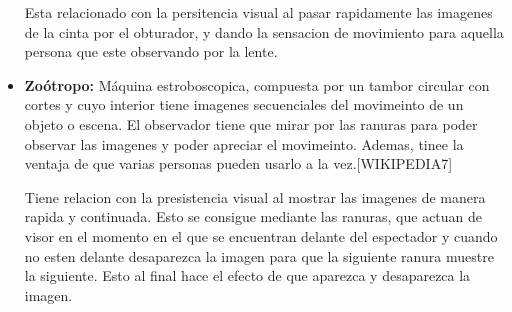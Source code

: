 \documentclass{article}
\begin{document}
\begin{itemize}
    Esta relacionado con la persitencia visual al pasar rapidamente las imagenes de la cinta por el obturador, y dando la sensacion de movimiento para aquella persona que este observando por la lente.

    \item \textbf{Zoótropo: }Máquina estroboscopica, compuesta por un tambor circular con cortes y cuyo interior tiene imagenes secuenciales del movimeinto de un objeto o escena. El observador tiene que mirar por las ranuras para poder observar las imagenes y poder apreciar el movimeinto. Ademas, tinee la ventaja de que varias personas pueden usarlo a la vez.[WIKIPEDIA7]
    
    Tiene relacion con la presistencia visual al mostrar las imagenes de manera rapida y continuada. Esto se consigue mediante las ranuras, que actuan de visor en el momento en el que se encuentran delante del espectador y cuando no esten delante desaparezca la imagen para que la siguiente ranura muestre la siguiente. Esto al final hace el efecto de que aparezca y desaparezca la imagen.
\end{itemize}
\end{document}
